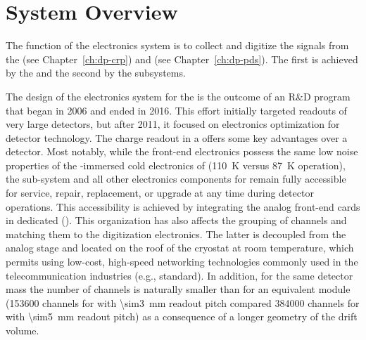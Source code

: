 \section{System Overview}
\label{sec:dp-tpcelec-overview}

The function of the   electronics system is to collect and digitize the signals from the  (see Chapter~\ref{ch:dp-crp}) and  (see Chapter~\ref{ch:dp-pds}). The first is achieved by the  and the second by the  subsystems. 

The design of the electronics system for the   is the outcome of an R\&D program that began in 2006 and ended in 2016. This effort initially targeted readouts of very large  detectors, but after 2011, it focused on electronics optimization for  detector technology. The charge readout in a   offers some key advantages over a  detector. Most notably, while the  front-end electronics possess the same low noise properties of the -immersed cold electronics of  (\SI{110}{\kelvin} versus \SI{87}{\kelvin} operation), the sub-system and all other electronics components for  remain fully accessible for service, repair, replacement, or upgrade at any time during detector operations. This accessibility is achieved by integrating the analog front-end cards in dedicated \fdth (). This organization has also affects the grouping of channels and matching them to the digitization electronics. The latter is decoupled from the analog stage and located on the roof of the cryostat at room temperature, which permits using low-cost, high-speed networking technologies commonly used in the telecommunication industries (e.g.,  standard). In addition, for the same detector mass the number of  channels is naturally smaller than for an  equivalent module (\num{153600} channels for  with \SI{\sim3}{\mm} readout pitch compared \num{384000} channels for  with \SI{\sim5}{\mm} readout pitch) as a consequence of a longer geometry of the drift volume. 

